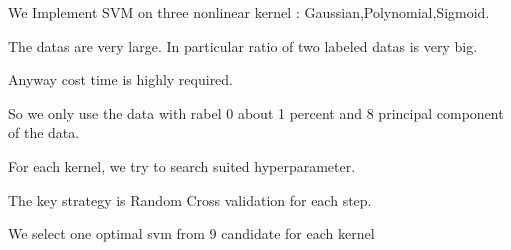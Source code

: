 \documentclass[11pt]{article}
\begin{document}
\vspace{1ex}
    We Implement SVM on three nonlinear kernel :
Gaussian,Polynomial,Sigmoid.

\vspace{1ex}
    The datas are very large. In particular ratio of two labeled datas is
very big.

\vspace{1ex}
    Anyway cost time is highly required.

\vspace{1ex}
    So we only use the data with rabel 0 about 1 percent and 8 principal
component of the data.

\vspace{1ex}
    For each kernel, we try to search suited hyperparameter.

\vspace{1ex}
    The key strategy is Random Cross validation for each step.

\vspace{1ex}
    We select one optimal svm from 9 candidate for each kernel
\end{document}
